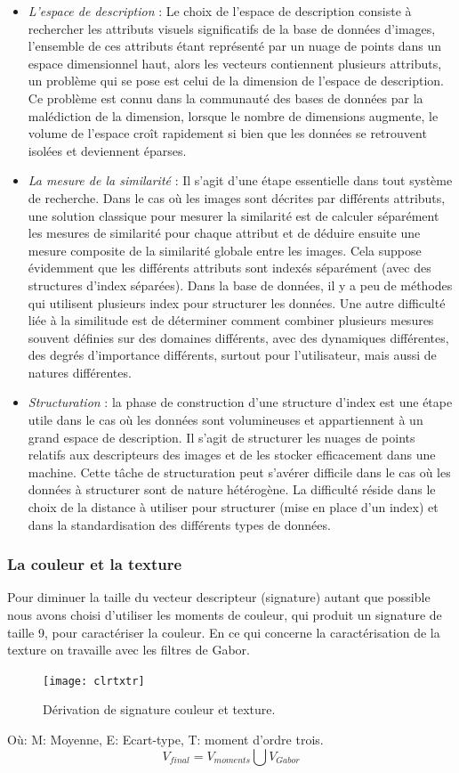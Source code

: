 \begin{itemize}
	\item  \textit{L'espace de description} : Le choix de l'espace de description consiste à rechercher les attributs visuels significatifs de la base de données d'images, l'ensemble de ces
	attributs étant représenté par un nuage de points dans un espace dimensionnel haut, alors les vecteurs contiennent plusieurs attributs, un problème qui se pose est celui de la dimension de l'espace de description. Ce problème est connu dans la communauté
	des bases de données par la malédiction de la dimension, lorsque le nombre de dimensions augmente, le volume de l'espace croît rapidement si bien que les données se retrouvent isolées et deviennent éparses.
	
	\item \textit{ La mesure de la similarité} : Il s'agit d'une étape essentielle dans tout système de
	recherche. Dans le cas où les images sont décrites par différents attributs, une solution
	classique pour mesurer la similarité est de calculer séparément les mesures de
	similarité pour chaque attribut et de déduire ensuite une mesure composite de la
	similarité globale entre les images. Cela suppose évidemment que les différents
	attributs sont indexés séparément (avec des structures d'index séparées). Dans la base
	de données, il y a peu de méthodes qui utilisent plusieurs index pour structurer les
	données. Une autre difficulté liée à la similitude est de déterminer comment combiner
	plusieurs mesures souvent définies sur des domaines différents, avec des dynamiques
	différentes, des degrés d'importance différents, surtout pour l'utilisateur, mais aussi de
	natures différentes.
	
	\item \textit{Structuration} : la phase de construction d'une structure d'index est une étape utile dans
	le cas où les données sont volumineuses et appartiennent à un grand espace de
	description. Il s'agit de structurer les nuages de points relatifs aux descripteurs des
	images et de les stocker efficacement dans une machine. Cette tâche de structuration
	peut s'avérer difficile dans le cas où les données à structurer sont de nature hétérogène.
	La difficulté réside dans le choix de la distance à utiliser pour structurer (mise en place
	d'un index) et dans la standardisation des différents types de données.
\end{itemize}
\subsubsection{La couleur et la texture}
Pour diminuer la taille du vecteur descripteur (signature) autant que possible nous avons choisi d'utiliser les moments de couleur, qui produit un signature de taille 9, pour caractériser la couleur. En ce qui concerne la caractérisation de la texture on travaille avec les filtres de Gabor.
\begin{figure}[H]
	\centering
	\texttt{[image: clrtxtr]}
	\caption{Dérivation de signature couleur et texture.}
\end{figure}
Où: 
M: Moyenne, E: Ecart-type, T: moment d'ordre trois.
\begin{equation}
V_{final} = V_{moments} \bigcup V_{Gabor}
\end{equation}
